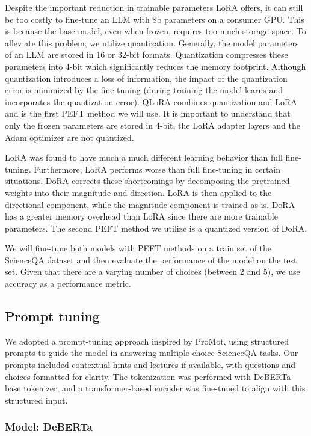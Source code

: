 \documentclass{article}
\begin{document}
Despite the important reduction in trainable parameters LoRA offers, it can still be too costly to fine-tune an LLM with 8b parameters on a consumer GPU. This is because the base model, even when frozen, requires too much storage space. To alleviate this problem, we utilize quantization. Generally, the model parameters of an LLM are stored in 16 or 32-bit formats. Quantization compresses these parameters into 4-bit which significantly reduces the memory footprint. Although quantization introduces a loss of information, the impact of the quantization error is minimized by the fine-tuning (during training the model learns and incorporates the quantization error). QLoRA combines quantization and LoRA and is the first PEFT method we will use. It is important to understand that only the frozen parameters are stored in 4-bit, the LoRA adapter layers and the Adam optimizer are not quantized.\par

LoRA was found to have much a much different learning behavior than full fine-tuning. Furthermore, LoRA performs worse than full fine-tuning in certain situations. DoRA corrects these shortcomings by decomposing the pretrained weights into their magnitude and direction. LoRA is then applied to the directional component, while the magnitude component is trained as is. DoRA has a greater memory overhead than LoRA since there are more trainable parameters. The second PEFT method we utilize is a quantized version of DoRA.\par

We will fine-tune both models with PEFT methods on a train set of the ScienceQA dataset and then evaluate the performance of the model on the test set. Given that there are a varying number of choices (between 2 and 5), we use accuracy as a performance metric.

\subsection{Prompt tuning}

We adopted a prompt-tuning approach inspired by ProMot, using structured prompts to guide the model in answering multiple-choice ScienceQA tasks. Our prompts included contextual hints and lectures if available, with questions and choices formatted for clarity. The tokenization was performed with DeBERTa-base tokenizer, and a transformer-based encoder was fine-tuned to align with this structured input. 

\subsubsection{Model: DeBERTa}
\end{document}
